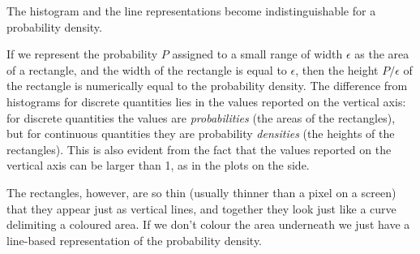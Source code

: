 \documentclass[
  a4paper,
  DIV=11,
  numbers=noendperiod,
  oneside]{scrreprt}
\begin{document}
The histogram and the line representations become indistinguishable for
a probability density.

If we represent the probability \(P\) assigned to a small range of width
\(\epsilon\) as the area of a rectangle, and the width of the rectangle
is equal to {\(\epsilon\),} then the height \(P/\epsilon\) of the
rectangle is numerically equal to the probability density. The
difference from histograms for discrete quantities lies in the values
reported on the vertical axis: for discrete quantities the values are
\emph{probabilities} (the areas of the rectangles), but for continuous
quantities they are probability \emph{densities} (the heights of the
rectangles). This is also evident from the fact that the values reported
on the vertical axis can be larger than 1, as in the plots on the side.

The rectangles, however, are so thin (usually thinner than a pixel on a
screen) that they appear just as vertical lines, and together they look
just like a curve delimiting a coloured area. If we don't colour the
area underneath we just have a line-based representation of the
probability density.
\end{document}
